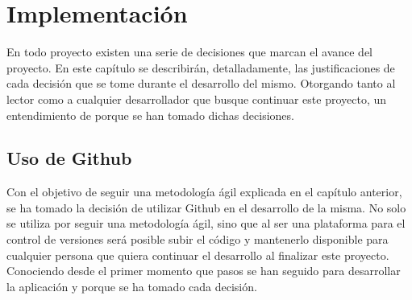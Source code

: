 \chapter{Implementación}
En todo proyecto existen una serie de decisiones que marcan el avance del proyecto. En este capítulo se describirán, detalladamente, las justificaciones de cada decisión que se tome durante el desarrollo del mismo. Otorgando tanto al lector como a cualquier desarrollador que busque continuar este proyecto, un entendimiento de porque se han tomado dichas decisiones.

\section{Uso de Github}
Con el objetivo de seguir una metodología ágil explicada en el capítulo anterior, se ha tomado la decisión de utilizar Github en el desarrollo de la misma. No solo se utiliza por seguir una metodología ágil, sino que al ser una plataforma para el control de versiones será posible subir el código y mantenerlo disponible para cualquier persona que quiera continuar el desarrollo al finalizar este proyecto. Conociendo desde el primer momento que pasos se han seguido para desarrollar la aplicación y porque se ha tomado cada decisión.

